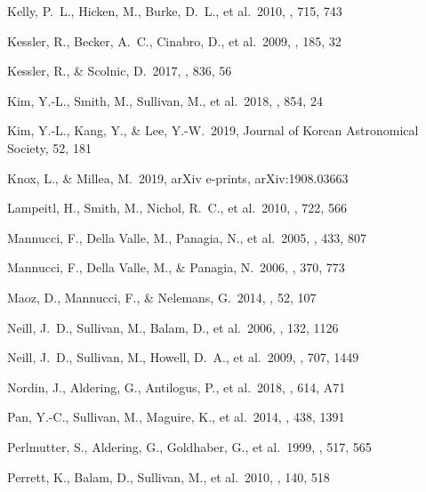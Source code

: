 \documentclass[]{aa}
\begin{document}
\begin{thebibliography}{}

 Kelly, P.~L., Hicken, M., Burke, D.~L.,
et al.\ 2010, \apj, 715, 743

 Kessler, R., Becker, A.~C., Cinabro,
D., et al.\ 2009, \apjs, 185, 32

 Kessler, R., \& Scolnic, D.\
2017, \apj, 836, 56

 Kim, Y.-L., Smith, M., Sullivan, M., et al.\
2018, \apj, 854, 24

 Kim, Y.-L., Kang, Y., \& Lee, Y.-W.\ 2019,
Journal of Korean Astronomical Society, 52, 181

 Knox, L., \& Millea, M.\ 2019, arXiv
e-prints, arXiv:1908.03663


 Lampeitl, H., Smith, M., Nichol,
R.~C., et al.\ 2010, \apj, 722, 566


 Mannucci, F., Della Valle, M.,
Panagia, N., et al.\ 2005, \aap, 433, 807 

 Mannucci, F., Della Valle, M., \&
Panagia, N.\ 2006, \mnras, 370, 773 

 Maoz, D., Mannucci, F., \&
Nelemans, G.\ 2014, \araa, 52, 107 



 Neill, J.~D., Sullivan, M., Balam, D.,
et al.\ 2006, \aj, 132, 1126

 Neill, J.~D., Sullivan, M., Howell,
D.~A., et al.\ 2009, \apj, 707, 1449

 Nordin, J., Aldering, G., Antilogus,
P., et al.\ 2018, \aap, 614, A71


 Pan, Y.-C., Sullivan, M., Maguire, K., et
al.\ 2014, \mnras, 438, 1391

 Perlmutter, S., Aldering, G.,
Goldhaber, G., et al.\ 1999, \apj, 517, 565

 Perrett, K., Balam, D., Sullivan,
M., et al.\ 2010, \aj, 140, 518


\end{thebibliography}
\end{document}
